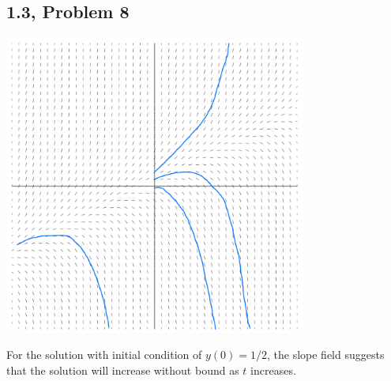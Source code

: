 \documentclass[12pt]{mypackage}
\begin{document}
\subsection{1.3, Problem 8}%
\begin{center}
  \includegraphics[width=10cm]{images/1_3_8.png}
\end{center}
For the solution with initial condition of $y(0) = 1/2$, the slope field suggests that the solution will increase without bound as $t$ increases.
%
\end{document}
